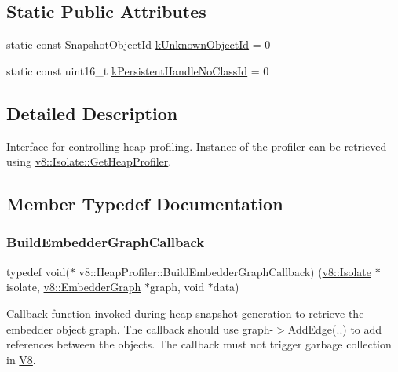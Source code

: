 \subsection*{Static Public Attributes}
\begin{DoxyCompactItemize}
\item 
static const Snapshot\+Object\+Id \mbox{\hyperlink{classv8_1_1HeapProfiler_abf2b9d8facb18473f9b124ab8baf5786}{k\+Unknown\+Object\+Id}} = 0
\item 
static const uint16\+\_\+t \mbox{\hyperlink{classv8_1_1HeapProfiler_a272c9af3ea5cd90a2737af3d22a7eb78}{k\+Persistent\+Handle\+No\+Class\+Id}} = 0
\end{DoxyCompactItemize}


\subsection{Detailed Description}
Interface for controlling heap profiling. Instance of the profiler can be retrieved using \mbox{\hyperlink{classv8_1_1Isolate_a9c48259615e8370f6f0efd27cd7f99a6}{v8\+::\+Isolate\+::\+Get\+Heap\+Profiler}}. 

\subsection{Member Typedef Documentation}
\mbox{\label{classv8_1_1HeapProfiler_a29c98afa5ce0ea543eef904201bc3e40}} 
\subsubsection{\texorpdfstring{Build\+Embedder\+Graph\+Callback}{BuildEmbedderGraphCallback}}
{\footnotesize\ttfamily typedef void($\ast$ v8\+::\+Heap\+Profiler\+::\+Build\+Embedder\+Graph\+Callback) (\mbox{\hyperlink{classv8_1_1Isolate}{v8\+::\+Isolate}} $\ast$isolate, \mbox{\hyperlink{classv8_1_1EmbedderGraph}{v8\+::\+Embedder\+Graph}} $\ast$graph, void $\ast$data)}

Callback function invoked during heap snapshot generation to retrieve the embedder object graph. The callback should use graph-\/$>$Add\+Edge(..) to add references between the objects. The callback must not trigger garbage collection in \mbox{\hyperlink{classv8_1_1V8}{V8}}. \mbox{\label{classv8_1_1HeapProfiler_a7f34c8eb67f9502e5778695187ea0e96}} 
